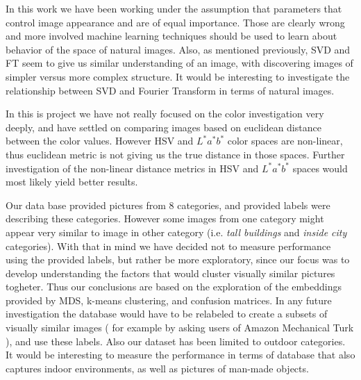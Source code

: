 \documentclass{report}
\begin{document}
In this work we have been working under the assumption that parameters that control image appearance and are of equal importance. Those are clearly wrong and more involved machine learning techniques should be used to learn about behavior of the space of natural images. Also, as mentioned previously, SVD and FT seem to give us similar understanding of an image, with discovering images of simpler versus more complex structure. It would be interesting to investigate the relationship between SVD and Fourier Transform in terms of natural images. 

In this is project we have not really focused on the color investigation very deeply, and have settled on comparing images based on euclidean distance between the  color values. However HSV and $L^*a^*b^*$ color spaces are non-linear, thus euclidean metric is not giving us the true distance in those spaces. Further investigation of the non-linear distance metrics in HSV and $L^*a^*b^*$ spaces would most likely yield better results.

Our data base provided pictures from 8 categories, and provided labels were describing these categories. However some images from one category might appear very similar to image in other category (i.e. \textit{tall buildings} and \textit{inside city} categories). With that in mind we have decided not to measure performance using the provided labels, but rather be more exploratory, since our focus was to develop understanding the factors that would cluster visually similar pictures togheter. Thus our conclusions are based on the exploration of the embeddings provided by MDS, k-means clustering, and confusion matrices. In any future investigation the database would have to be relabeled to create a subsets of visually similar images ( for example by asking users of Amazon Mechanical Turk ), and use these labels. Also our dataset has been limited to outdoor categories. It would be interesting to measure the performance in terms of database that also captures indoor environments, as well as pictures of man-made objects.
\end{document}
